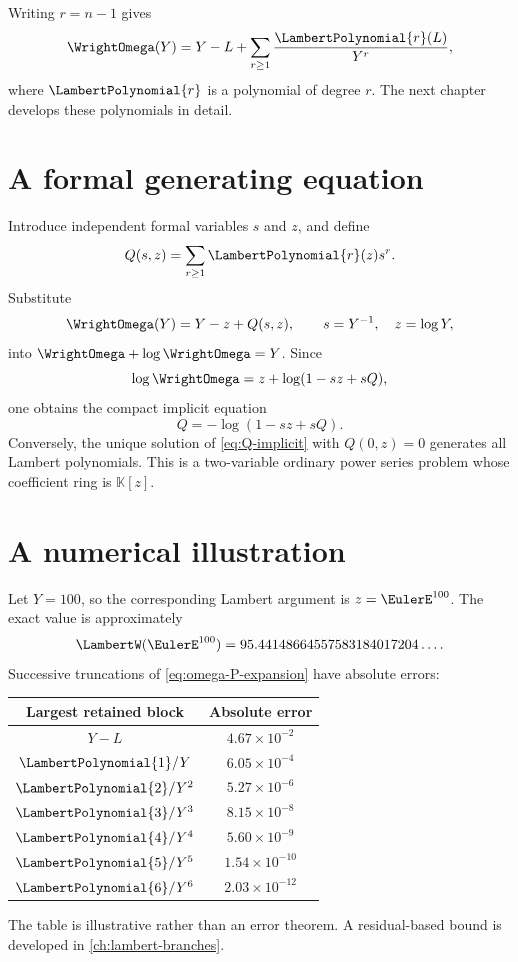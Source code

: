 \documentclass[11pt,oneside]{book}
\theoremstyle{definition}
\theoremstyle{remark}
\newcommand{\K}{\mathbb K}
\begin{document}
Writing $r=n-1$ gives
\begin{equation}\label{eq:omega-P-expansion}
 \WrightOmega(Y)=Y-L+\sum_{r\ge1}\frac{\LambertPolynomial{r}(L)}{Y^r},
\end{equation}
where $\LambertPolynomial{r}$ is a polynomial of degree $r$.  The next chapter develops these
polynomials in detail.

\section{A formal generating equation}
Introduce independent formal variables $s$ and $z$, and define
\begin{equation}\label{eq:Q-generating}
 Q(s,z)=\sum_{r\ge1}\LambertPolynomial{r}(z)s^r.
\end{equation}
Substitute
\[
 \WrightOmega(Y)=Y-z+Q(s,z),
 \qquad s=Y^{-1},\quad z=\log Y,
\]
into $\WrightOmega+\log\WrightOmega=Y$.  Since
\[
 \log\WrightOmega=z+\log(1-sz+sQ),
\]
one obtains the compact implicit equation
\begin{equation}\label{eq:Q-implicit}
 Q=-\log(1-sz+sQ).
\end{equation}
Conversely, the unique solution of \eqref{eq:Q-implicit} with $Q(0,z)=0$
generates all Lambert polynomials.  This is a two-variable ordinary power
series problem whose coefficient ring is $\K[z]$.

\section{A numerical illustration}
Let $Y=100$, so the corresponding Lambert argument is $z=\EulerE^{100}$.  The exact
value is approximately
\[
 \LambertW(\EulerE^{100})=95.44148664557583184017204\ldots.
\]
Successive truncations of \eqref{eq:omega-P-expansion} have absolute errors:
\begin{center}
\begin{tabular}{@{}c c@{}}
\toprule
Largest retained block & Absolute error \\
\midrule
$Y-L$ & $4.67\times10^{-2}$ \\
$\LambertPolynomial{1}/Y$ & $6.05\times10^{-4}$ \\
$\LambertPolynomial{2}/Y^2$ & $5.27\times10^{-6}$ \\
$\LambertPolynomial{3}/Y^3$ & $8.15\times10^{-8}$ \\
$\LambertPolynomial{4}/Y^4$ & $5.60\times10^{-9}$ \\
$\LambertPolynomial{5}/Y^5$ & $1.54\times10^{-10}$ \\
$\LambertPolynomial{6}/Y^6$ & $2.03\times10^{-12}$ \\
\bottomrule
\end{tabular}
\end{center}
The table is illustrative rather than an error theorem.  A residual-based
bound is developed in \cref{ch:lambert-branches}.
\end{document}
